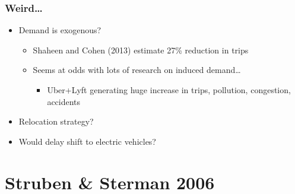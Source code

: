 \documentclass{beamer}
\begin{document}
\begin{frame}
  \frametitle{Weird\dots}
  \begin{itemize}
  \item Demand is exogenous?
    \begin{itemize}
    \item Shaheen and Cohen (2013) estimate 27\% reduction in trips
    \item Seems at odds with lots of research on induced demand\dots
      \begin{itemize}
      \item Uber+Lyft generating huge increase in trips, pollution, congestion, accidents
      \end{itemize}
    \end{itemize}
  \item Relocation strategy?
  \item Would delay shift to electric vehicles?
  \end{itemize}
\end{frame}





\section{Struben \& Sterman 2006}
\end{document}
